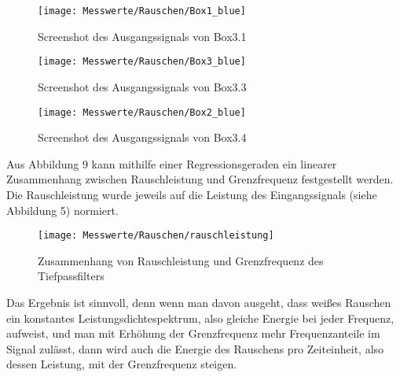 \documentclass[a4paper, 12pt]{article}
\begin{document}
\begin{figure}[H]
\begin{center}
	\texttt{[image: Messwerte/Rauschen/Box1\_blue]}
  \caption{Screenshot des Ausgangssignals von Box3.1}
  \end{center}
\end{figure}

\begin{figure}[H]
  \begin{center}
	\texttt{[image: Messwerte/Rauschen/Box3\_blue]}
  \caption{Screenshot des Ausgangssignals von Box3.3}
\end{center}
\end{figure}

\begin{figure}[H]
	\texttt{[image: Messwerte/Rauschen/Box2\_blue]}
  \caption{Screenshot des Ausgangssignals von Box3.4}
\end{figure}

Aus Abbildung 9 kann mithilfe einer Regressionsgeraden ein linearer Zusammenhang zwischen Rauschleistung und
Grenzfrequenz festgestellt werden. Die Rauschleistung wurde jeweils auf die
Leistung des Eingangssignals (siehe Abbildung 5) normiert.

\begin{figure}[H]
	\texttt{[image: Messwerte/Rauschen/rauschleistung]}
  \caption{Zusammenhang von Rauschleistung und Grenzfrequenz des Tiefpassfilters}
\end{figure}

Das Ergebnis ist sinnvoll, denn wenn man davon ausgeht, dass weißes Rauschen
ein konstantes Leistungsdichtespektrum, also gleiche Energie bei jeder Frequenz,
aufweist, und man mit Erhöhung der Grenzfrequenz mehr Frequenzanteile im Signal
zulässt, dann wird auch die Energie des Rauschens pro Zeiteinheit, also dessen
Leistung, mit der Grenzfrequenz steigen. 
\end{document}
